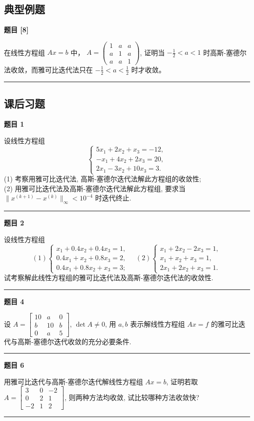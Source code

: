\documentclass[a4paper,12pt]{ctexart}
\newcommand{\problem}[1]{
    \par\noindent\textbf{题目 #1} \quad
}
\newcommand{\workspace}[1][5cm]{
    \par
    \vspace{#1}
    \noindent\rule{\textwidth}{0.1pt} %
    \vspace{0.5em}
    \par
}
\begin{document}
\subsection*{典型例题}

\problem{[8]}
在线性方程组 $Ax = b$ 中，
$A = \begin{pmatrix} 1 & a & a \\ a & 1 & a \\ a & a & 1 \end{pmatrix}$,
证明当 $-\frac{1}{2} < a < 1$ 时高斯-塞德尔法收敛，而雅可比迭代法只在 $-\frac{1}{2} < a < \frac{1}{2}$ 时才收敛。
\workspace[8cm]

\subsection*{课后习题}

\problem{1}
设线性方程组
\[
\begin{cases}
5x_1 + 2x_2 + x_3 = -12, \\
-x_1 + 4x_2 + 2x_3 = 20, \\
2x_1 - 3x_2 + 10x_3 = 3.
\end{cases}
\]
(1) 考察用雅可比迭代法, 高斯-塞德尔迭代法解此方程组的收敛性; \\
(2) 用雅可比迭代法及高斯-塞德尔迭代法解此方程组, 要求当 $\|x^{(k+1)} - x^{(k)}\|_\infty < 10^{-4}$ 时迭代终止.
\workspace[10cm]

\problem{2}
设线性方程组
\[
(1) \begin{cases}
x_1 + 0.4x_2 + 0.4x_3 = 1, \\
0.4x_1 + x_2 + 0.8x_3 = 2, \\
0.4x_1 + 0.8x_2 + x_3 = 3;
\end{cases}
\quad
(2) \begin{cases}
x_1 + 2x_2 - 2x_3 = 1, \\
x_1 + x_2 + x_3 = 1, \\
2x_1 + 2x_2 + x_3 = 1.
\end{cases}
\]
试考察解此线性方程组的雅可比迭代法及高斯-塞德尔迭代法的收敛性.
\workspace[8cm]

\problem{4}
设 $A = \begin{bmatrix} 10 & a & 0 \\ b & 10 & b \\ 0 & a & 5 \end{bmatrix}$, $\det A \neq 0$, 用 $a, b$ 表示解线性方程组 $Ax=f$ 的雅可比迭代与高斯-塞德尔迭代收敛的充分必要条件.
\workspace[8cm]

\problem{6}
用雅可比迭代与高斯-塞德尔迭代解线性方程组
$Ax = b$, 证明若取 $A = \begin{bmatrix} 3 & 0 & -2 \\ 0 & 2 & 1 \\ -2 & 1 & 2 \end{bmatrix}$, 则两种方法均收敛, 试比较哪种方法收敛快?
\workspace[8cm]
\end{document}

